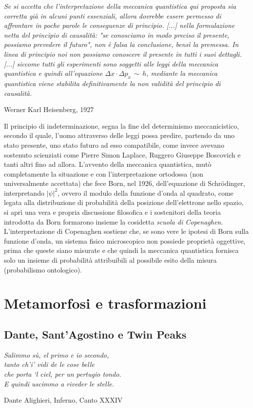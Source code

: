 \documentclass[a4paper,12pt]{report}
\begin{document}
\setlength{\epigraphwidth}{0.8\textwidth}
\epigraph{\textit{Se si accetta che l'interpretazione della meccanica quantistica qui proposta sia corretta già in alcuni punti essenziali, allora dovrebbe essere permesso di affrontare in poche parole le conseguenze di principio. [...] nella formulazione netta del principio di causalità: "se conosciamo in modo preciso il presente, possiamo prevedere il futuro", non è falsa la conclusione, bensì la premessa. In linea di principio noi non possiamo conoscere il presente in tutti i suoi dettagli. [...] siccome tutti gli esperimenti sono soggetti alle leggi della meccanica quantistica e quindi all'equazione ${\displaystyle \Delta x\cdot \Delta p_{x}\,\sim \,h}$, mediante la meccanica quantistica viene stabilita definitivamente la non validità del principio di causalità.}}{Werner Karl Heisenberg, 1927}

Il principio di indeterminazione, segna la fine del determinismo meccanicistico, secondo il quale, l'uomo attraverso delle leggi possa predire, partendo da uno stato presente, uno stato futuro ad esso compatibile, come invece avevano sostenuto scienziati come Pierre Simon Laplace, Ruggero Giuseppe Boscovich e tanti altri fino ad allora.
L'avvento della meccanica quantistica, mutò completamente la situazione e con l'interpretazione ortodossa (non universalmente accettata) che fece Born, nel 1926, dell'equazione di Schrödinger, interpretando ${\displaystyle |\psi |^{2}}$, ovvero il modulo della funzione d'onda al quadrato, come legata alla distribuzione di probabilità della posizione dell'elettrone nello spazio, si aprì una vera e propria discussione filosofica e i sostenitori della teoria introdotta da Born formarono insieme la cosidetta \textit{scuola di Copenaghen}.
L'interpretazione di Copenaghen sostiene che, se sono vere le ipotesi di Born sulla funzione d'onda, un sistema fisico microscopico non possiede proprietà oggettive, prima che queste siano misurate e che quindi la meccanica quantistica fornisca solo un insieme di probabilità attribuibili al possibile esito della misura (probabilismo ontologico). 

\chapter{Metamorfosi e trasformazioni}
\section{Dante, Sant'Agostino e Twin Peaks}
\setlength{\epigraphwidth}{0.5\textwidth}
\epigraph{\textit{Salimmo sù, el primo e io secondo,\\
                  tanto ch’i’ vidi de le cose belle\\
                  che porta ‘l ciel, per un pertugio tondo.\\
                  \medskip
                  E quindi uscimmo a riveder le stelle.}
                 }
                  {Dante Alighieri, Inferno, Canto XXXIV }
\end{document}
